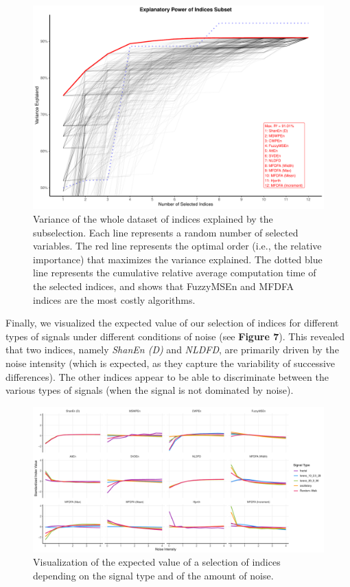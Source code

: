 \documentclass[
  man]{apa6}
\begin{document}
\begin{figure}
\centering
\includegraphics{manuscript_files/figure-latex/varexplained-1.pdf}
\caption{\label{fig:varexplained}Variance of the whole dataset of indices explained by the subselection. Each line represents a random number of selected variables. The red line represents the optimal order (i.e., the relative importance) that maximizes the variance explained. The dotted blue line represents the cumulative relative average computation time of the selected indices, and shows that FuzzyMSEn and MFDFA indices are the most costly algorithms.}
\end{figure}

Finally, we visualized the expected value of our selection of indices for different types of signals under different conditions of noise (see \textbf{Figure 7}). This revealed that two indices, namely \emph{ShanEn (D)} and \emph{NLDFD}, are primarily driven by the noise intensity (which is expected, as they capture the variability of successive differences). The other indices appear to be able to discriminate between the various types of signals (when the signal is not dominated by noise).

\begin{figure}
\centering
\includegraphics{manuscript_files/figure-latex/models-1.pdf}
\caption{\label{fig:models}Visualization of the expected value of a selection of indices depending on the signal type and of the amount of noise.}
\end{figure}
\end{document}
